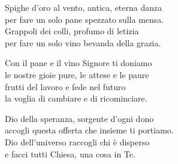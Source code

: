 
\strofa Spighe d'oro al vento, antica, eterna danza\\
per fare un solo pane spezzato sulla mensa.\\
Grappoli dei colli, profumo di letizia\\
per fare un solo vino bevanda della grazia.

\spazio

\strofa Con il pane e il vino Signore ti doniamo\\
le nostre gioie pure, le attese e le paure\\
frutti del lavoro e fede nel futuro\\
la voglia di cambiare e di ricominciare.

\spazio

\strofa Dio della speranza, sorgente d'ogni dono\\
accogli questa offerta che insieme ti portiamo.\\
Dio dell'universo raccogli chi è disperso\\
e facci tutti Chiesa, una cosa in Te.